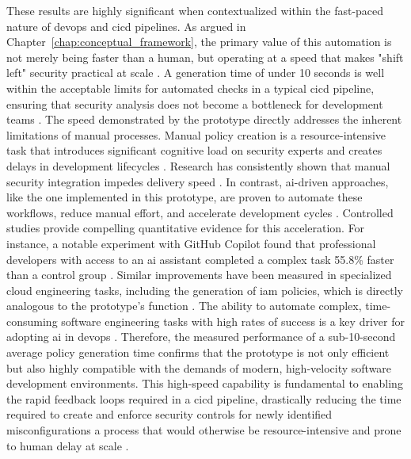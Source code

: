 These results are highly significant when contextualized within the fast-paced nature of \gls{devops} and \gls{cicd} pipelines. As argued in Chapter~\ref{chap:conceptual_framework}, the primary value of this automation is not merely being faster than a human, but operating at a speed that makes "shift left" security practical at scale \cite{vaidya_devsecops_2024}. A generation time of under 10 seconds is well within the acceptable limits for automated checks in a typical \gls{cicd} pipeline, ensuring that security analysis does not become a bottleneck for development teams \cite{li_automated_2024}.
The speed demonstrated by the prototype directly addresses the inherent limitations of manual processes. Manual policy creation is a resource-intensive task that introduces significant cognitive load on security experts and creates delays in development lifecycles \cite{gunathilaka_context-aware_2025, mahboob_future_2024}. Research has consistently shown that manual security integration impedes delivery speed \cite{gunathilaka_context-aware_2025, mahboob_future_2024}. In contrast, \gls{ai}-driven approaches, like the one implemented in this prototype, are proven to automate these workflows, reduce manual effort, and accelerate development cycles \cite{fu_ai_2025}.
Controlled studies provide compelling quantitative evidence for this acceleration. For instance, a notable experiment with GitHub Copilot found that professional developers with access to an \gls{ai} assistant completed a complex task 55.8\% faster than a control group \cite{peng_impact_2023}. Similar improvements have been measured in specialized cloud engineering tasks, including the generation of \gls{iam} policies, which is directly analogous to the prototype's function \cite{kesireddy_copilot_2025}. The ability to automate complex, time-consuming software engineering tasks with high rates of success is a key driver for adopting \gls{ai} in \gls{devops} \cite{tufano_autodev_2024}.
Therefore, the measured performance of a sub-10-second average policy generation time confirms that the prototype is not only efficient but also highly compatible with the demands of modern, high-velocity software development environments. This high-speed capability is fundamental to enabling the rapid feedback loops required in a \gls{cicd} pipeline, drastically reducing the time required to create and enforce security controls for newly identified misconfigurations a process that would otherwise be resource-intensive and prone to human delay at scale \cite{vaidya_devsecops_2024}.

